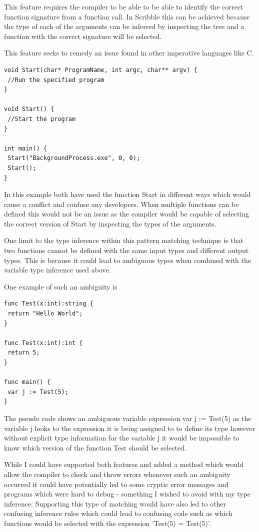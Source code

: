 \documentclass[]{final_report}
\begin{document}
This feature requires the compiler to be able to be able to identify the correct function signature from a function call. In Scribble this can be achieved because the type of each of the arguments can be inferred by inspecting the tree and a function with the correct signature will be selected.

This feature seeks to remedy an issue found in other imperative languages like C.

\begin{verbatim}
void Start(char* ProgramName, int argc, char** argv) {
 //Run the specified program
}

void Start() {
 //Start the program
}

int main() {
 Start("BackgroundProcess.exe", 0, 0);
 Start();
}
\end{verbatim}

In this example both have used the function Start in different ways which would cause a conflict and confuse any developers. When multiple functions can be defined this would not be an issue as the compiler would be capable of selecting the correct version of Start by inspecting the types of the arguments.

One limit to the type inference within this pattern matching technique is that two functions cannot be defined with the same input types and different output types. This is because it could lead to ambiguous types when combined with the variable type inference used above.

One example of such an ambiguity is
\begin{verbatim}
func Test(x:int):string {
 return "Hello World";
}

func Test(x:int):int {
 return 5; 
}

func main() { 
 var j := Test(5);
}
\end{verbatim}

The pseudo code shows an ambiguous variable expression var j := Test(5) as the variable j looks to the expression it is being assigned to to define its type however without explicit type information for the variable j it would be impossible to know which version of the function Test should be selected.

While I could have supported both features and added a method which would allow the compiler to check and throw errors whenever such an ambiguity occurred it could have potentially led to some cryptic error messages and programs which were hard to debug - something I wished to avoid with my type inference. Supporting this type of matching would have also led to other confusing inference rules which could lead to confusing code such as which functions would be selected with the expression 'Test(5) = Test(5)'.
\end{document}
